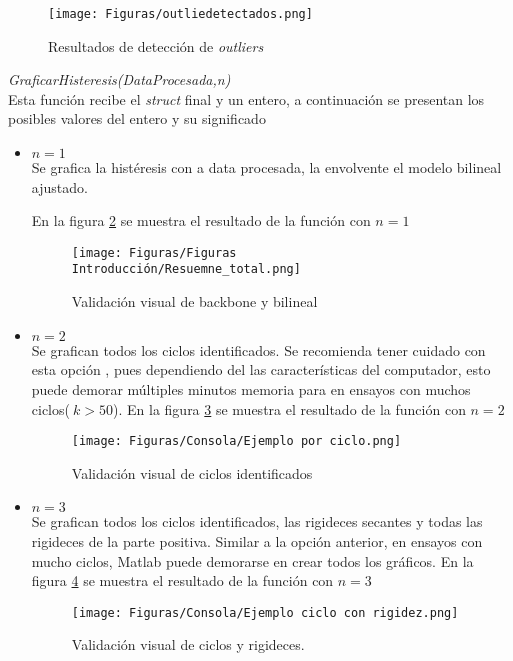 \documentclass[a4paper, 11pt,article,oneside]{memoir}%
\begin{document}
    \begin{figure} [H]
    \centering
    \texttt{[image: Figuras/outliedetectados.png]}
    \caption{\label{prepro} Resultados de detección de \textit{outliers}}
\end{figure}
\textit{GraficarHisteresis(DataProcesada,n)}\\
Esta función recibe el \textit{struct} final y un entero, a continuación se presentan los posibles valores del entero y su significado
\begin{itemize}
    \item $n=1$\\
    Se grafica la histéresis con a data procesada, la envolvente el modelo bilineal ajustado.\par 
   En la figura \ref{prepro3} se muestra el resultado de la función con $n=1$ 
     \begin{figure} [h!]
    \centering
    \texttt{[image: Figuras/Figuras Introducción/Resuemne\_total.png]}
    \caption{\label{prepro3}Validación visual de backbone y bilineal}
    \end{figure}
    \item $n=2$\\
    Se grafican todos los ciclos identificados. Se recomienda tener cuidado con esta opción , pues dependiendo del las características del computador, esto puede demorar múltiples minutos  memoria para  en ensayos con muchos ciclos($ ~k>50$). En la figura \ref{prepro4} se muestra el resultado de la función con $n=2$
    \begin{figure} [h!]
    \centering
    \texttt{[image: Figuras/Consola/Ejemplo por ciclo.png]}
    \caption{\label{prepro4}Validación visual de ciclos identificados}
    \end{figure}
    \item $n=3$\\
    Se grafican todos los ciclos identificados, las rigideces secantes y todas las rigideces de la parte positiva. Similar a la opción anterior, en ensayos con mucho ciclos, Matlab puede demorarse en crear todos los gráficos. En la figura \ref{prepro5} se muestra el resultado de la función con $n=3$
    \begin{figure} [h!]
    \centering
    \texttt{[image: Figuras/Consola/Ejemplo ciclo con rigidez.png]}
    \caption{\label{prepro5}Validación visual de ciclos y rigideces.}
    \end{figure}
\end{itemize}
\end{document}
